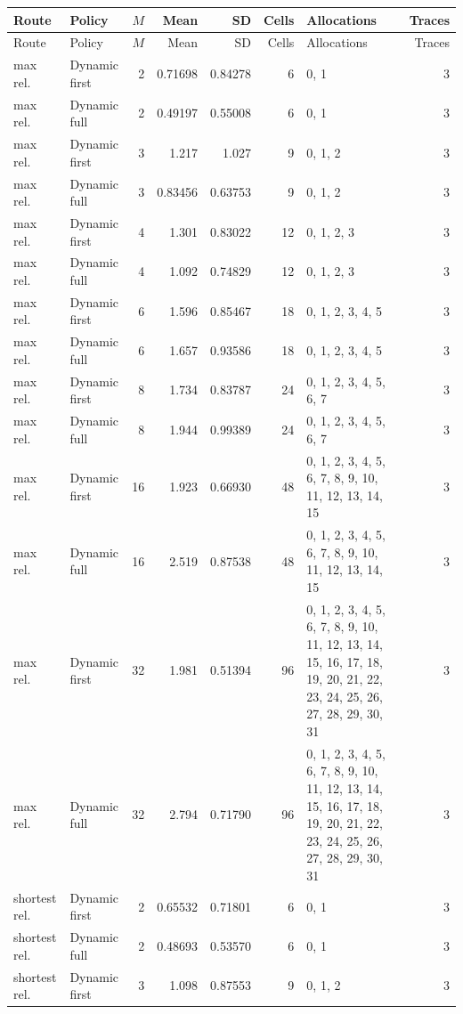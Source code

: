 \documentclass[10pt,a4paper]{article}
\begin{document}
\tiny\setlength{\tabcolsep}{2pt}\begin{longtable}{@{}p{23mm}p{29mm}rrrrp{36mm}r@{}}
\toprule Route & Policy & $M$ & Mean & SD & Cells & Allocations & Traces \\ \midrule\endfirsthead
\toprule Route & Policy & $M$ & Mean & SD & Cells & Allocations & Traces \\ \midrule\endhead
\bottomrule\endfoot
max rel. & Dynamic first & 2 & 0.71698 & 0.84278 & 6 & 0, 1 & 3 \\
max rel. & Dynamic full & 2 & 0.49197 & 0.55008 & 6 & 0, 1 & 3 \\
max rel. & Dynamic first & 3 & 1.217 & 1.027 & 9 & 0, 1, 2 & 3 \\
max rel. & Dynamic full & 3 & 0.83456 & 0.63753 & 9 & 0, 1, 2 & 3 \\
max rel. & Dynamic first & 4 & 1.301 & 0.83022 & 12 & 0, 1, 2, 3 & 3 \\
max rel. & Dynamic full & 4 & 1.092 & 0.74829 & 12 & 0, 1, 2, 3 & 3 \\
max rel. & Dynamic first & 6 & 1.596 & 0.85467 & 18 & 0, 1, 2, 3, 4, 5 & 3 \\
max rel. & Dynamic full & 6 & 1.657 & 0.93586 & 18 & 0, 1, 2, 3, 4, 5 & 3 \\
max rel. & Dynamic first & 8 & 1.734 & 0.83787 & 24 & 0, 1, 2, 3, 4, 5, 6, 7 & 3 \\
max rel. & Dynamic full & 8 & 1.944 & 0.99389 & 24 & 0, 1, 2, 3, 4, 5, 6, 7 & 3 \\
max rel. & Dynamic first & 16 & 1.923 & 0.66930 & 48 & 0, 1, 2, 3, 4, 5, 6, 7, 8, 9, 10, 11, 12, 13, 14, 15 & 3 \\
max rel. & Dynamic full & 16 & 2.519 & 0.87538 & 48 & 0, 1, 2, 3, 4, 5, 6, 7, 8, 9, 10, 11, 12, 13, 14, 15 & 3 \\
max rel. & Dynamic first & 32 & 1.981 & 0.51394 & 96 & 0, 1, 2, 3, 4, 5, 6, 7, 8, 9, 10, 11, 12, 13, 14, 15, 16, 17, 18, 19, 20, 21, 22, 23, 24, 25, 26, 27, 28, 29, 30, 31 & 3 \\
max rel. & Dynamic full & 32 & 2.794 & 0.71790 & 96 & 0, 1, 2, 3, 4, 5, 6, 7, 8, 9, 10, 11, 12, 13, 14, 15, 16, 17, 18, 19, 20, 21, 22, 23, 24, 25, 26, 27, 28, 29, 30, 31 & 3 \\
shortest rel. & Dynamic first & 2 & 0.65532 & 0.71801 & 6 & 0, 1 & 3 \\
shortest rel. & Dynamic full & 2 & 0.48693 & 0.53570 & 6 & 0, 1 & 3 \\
shortest rel. & Dynamic first & 3 & 1.098 & 0.87553 & 9 & 0, 1, 2 & 3 \\

\end{longtable}
\end{document}
